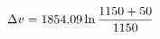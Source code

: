 \documentclass[preview]{standalone}
\begin{document}
\begin{align*}
\special{dvisvgm:raw <g id='unique000'>}\Delta v = 1854.09 \ln\frac{1150 + 50}{1150}\special{dvisvgm:raw </g>}
\end{align*}
\end{document}
